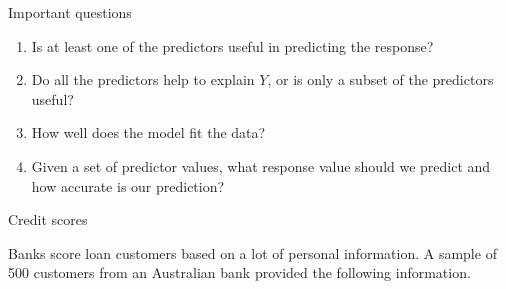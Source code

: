 \documentclass[14pt]{beamer}
\begin{document}
\begin{frame}{Important questions}\large 
\begin{enumerate}
\item Is at least one of the predictors useful in predicting the response?

\item Do all the predictors help to explain $Y$, or is only a subset of the predictors useful?

\item How well does the model fit the data?

\item Given a set of predictor values, what response value should we predict and how accurate is our prediction?

\end{enumerate}

\end{frame}

\begin{frame}{Credit scores}

Banks score loan customers based on a lot of personal information. A sample of 500 customers from an Australian bank provided the following information.\vspace*{.2cm}



\end{frame}
\end{document}
